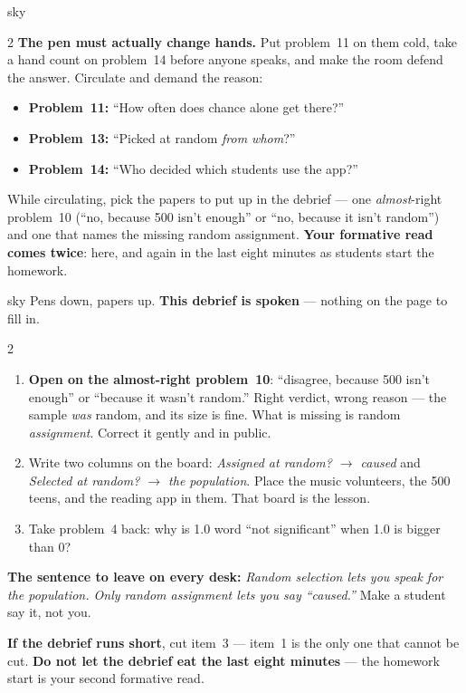 \documentclass[10pt]{article}
\begin{document}
\begin{skillbox}{sky}
\begin{multicols}{2}
\textbf{The pen must actually change hands.} Put problem~11 on them cold, take a hand count on
problem~14 before anyone speaks, and make the room defend the answer. Circulate and demand the
reason:
\begin{itemize}[leftmargin=1.1em, nosep]
  \item \textbf{Problem~11:} ``How often does chance alone get there?''
  \item \textbf{Problem~13:} ``Picked at random \emph{from whom}?''
  \item \textbf{Problem~14:} ``Who decided which students use the app?''
\end{itemize}
While circulating, pick the papers to put up in the debrief --- one \emph{almost}-right
problem~10 (``no, because 500 isn't enough'' or ``no, because it isn't random'') and one that
names the missing random assignment. \textbf{Your formative read comes twice}: here, and again
in the last eight minutes as students start the homework.
\end{multicols}
\end{skillbox}

\boxguard
\begin{skillbox}{sky}
Pens down, papers up. \textbf{This debrief is spoken} --- nothing on the page to fill in.
\begin{multicols}{2}
\begin{enumerate}[leftmargin=1.3em, nosep, itemsep=3pt]
  \item \textbf{Open on the almost-right problem~10}: ``disagree, because 500 isn't enough''
        or ``because it wasn't random.'' Right verdict, wrong reason --- the sample \emph{was}
        random, and its size is fine. What is missing is random \emph{assignment}. Correct it
        gently and in public.
  \item Write two columns on the board: \emph{Assigned at random? $\to$ caused} and
        \emph{Selected at random? $\to$ the population}. Place the music volunteers, the 500
        teens, and the reading app in them. That board is the lesson.
  \item Take problem~4 back: why is 1.0 word ``not significant'' when 1.0 is bigger than 0?
\end{enumerate}
\columnbreak
\textbf{The sentence to leave on every desk:} \emph{Random selection lets you speak for the
population. Only random assignment lets you say ``caused.''} Make a student say it, not you.

\textbf{If the debrief runs short}, cut item~3 --- item~1 is the only one that cannot be cut.
\textbf{Do not let the debrief eat the last eight minutes} --- the homework start is your
second formative read.
\end{multicols}
\end{skillbox}
\end{document}
